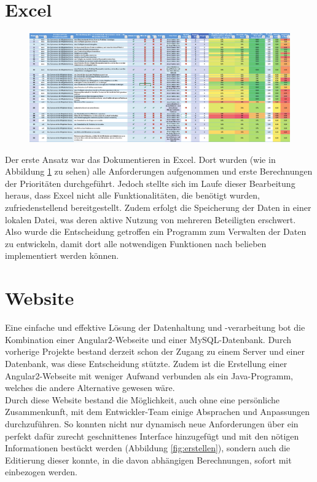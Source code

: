 \section{Excel}
\begin{figure}[!htb]
		\includegraphics[width=\textwidth]{images/excel.pdf}
\centering 
{} 
		\label{fig:excel}
\end{figure}
Der erste Ansatz war das Dokumentieren in Excel. Dort wurden (wie in Abbildung \ref{fig:excel} zu sehen) alle Anforderungen aufgenommen und erste Berechnungen der Prioritäten durchgeführt. Jedoch stellte sich im Laufe dieser Bearbeitung heraus, dass Excel nicht alle Funktionalitäten, die benötigt wurden, zufriedenstellend bereitgestellt. Zudem erfolgt die Speicherung der Daten in einer lokalen Datei, was deren aktive Nutzung von mehreren Beteiligten erschwert. Also wurde die Entscheidung getroffen ein Programm zum Verwalten der Daten zu entwickeln, damit dort alle notwendigen Funktionen nach belieben implementiert werden können.


\section{Website}

Eine einfache und effektive Lösung der Datenhaltung und -verarbeitung bot die Kombination einer Angular2-Webseite und einer MySQL-Datenbank. Durch vorherige Projekte bestand derzeit schon der Zugang zu einem Server und einer Datenbank, was diese Entscheidung stützte. Zudem ist die Erstellung einer Angular2-Webseite mit weniger Aufwand verbunden als ein Java-Programm, welches die andere Alternative gewesen wäre.\\

Durch diese Website bestand die Möglichkeit, auch ohne eine persönliche Zusammenkunft, mit dem Entwickler-Team einige Absprachen und Anpassungen durchzuführen. So konnten nicht nur dynamisch neue Anforderungen über ein perfekt dafür zurecht geschnittenes Interface hinzugefügt und mit den nötigen Informationen bestückt werden (Abbildung \ref{fig:erstellen}), sondern auch die Editierung dieser konnte, in die davon abhängigen Berechnungen, sofort mit einbezogen werden.\\


